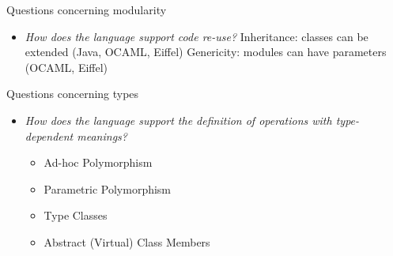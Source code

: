 \documentclass{popl}
\begin{document}
\begin{foil} 

Questions concerning modularity
\begin{itemize}
        \Q (How straightforward  is ``implementation hiding'')
        \items  Straightforward:        (\EG Haskell, Modula, Java, (O)CAML)
        \items  Awkward:                (\EG C, Postscript, Lisp, Scheme)


        \item   {\it How does the language support code re-use?}
        \items  Inheritance: classes can be extended (\EG Java, OCAML, Eiffel)
        \items  Genericity:  modules can have parameters (\EG OCAML, Eiffel)
\end{itemize}
\end{foil}

\begin{foil} 
Questions concerning types
\begin{itemize}

        \Q (Is type consistency checked as late as possible)
        \items  Static Typing:          (\EG Java, Eiffel, OCAML, CAML, Pascal)
        \items  Dynamic Typing:         (\EG Scheme, Lisp)

        \item {\it How does the language support the definition of operations with type-dependent meanings?}
        \begin{itemize}
              \item   Ad-hoc  Polymorphism
              \item   Parametric Polymorphism 
              \item   Type Classes  
              \item   Abstract (Virtual) Class Members  
        \end{itemize}
\end{itemize}
\end{foil}
\end{document}
